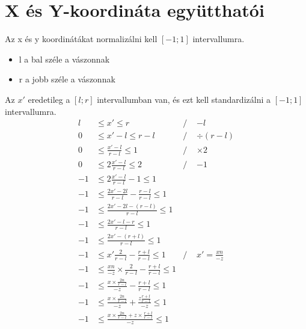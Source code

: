 \documentclass[12pt]{report}
\begin{document}
\section{X és Y-koordináta együtthatói}
Az x és y koordinátákat normalizálni kell $[-1;1]$ intervallumra.
\begin{itemize}
    \item l \text{-} a bal széle a vászonnak
    \item r \text{-} a jobb széle a vászonnak
\end{itemize}
Az $x'$ eredetileg a $[l;r]$ intervallumban van, és ezt kell standardizálni a $[-1;1]$ intervallumra.
\begin{align*}
    l  & \leq x' \leq r                                                           & \text{/ } & -l               \\
    0  & \leq x'-l \leq r-l                                                       & \text{/ } & \div (r-l)       \\
    0  & \leq \frac{x'-l}{r-l} \leq 1                                             & \text{/ } & \times 2         \\
    0  & \leq 2\frac{x'-l}{r-l} \leq 2                                            & \text{/ } & -1               \\
    -1 & \leq 2\frac{x'-l}{r-l}-1 \leq 1                                          &           &                  \\
    -1 & \leq \frac{2x'-2l}{r-l}-\frac{r-l}{r-l} \leq 1                           &           &                  \\
    -1 & \leq \frac{2x'-2l-(r-l)}{r-l} \leq 1                                     &           &                  \\
    -1 & \leq \frac{2x'-l-r}{r-l} \leq 1                                          &           &                  \\
    -1 & \leq \frac{2x'-(r+l)}{r-l} \leq 1                                        &           &                  \\
    -1 & \leq x'\frac{2}{r-l}-\frac{r+l}{r-l} \leq 1                              & \text{/ } & x'=\frac{xn}{-z} \\
    -1 & \leq \frac{xn}{-z}\times\frac{2}{r-l}-\frac{r+l}{r-l} \leq 1             &           &                  \\
    -1 & \leq \frac{x\times\frac{2n}{r-l}}{-z}-\frac{r+l}{r-l} \leq 1             &           &                  \\
    -1 & \leq \frac{x\times\frac{2n}{r-l}}{-z}+\frac{z\frac{r+l}{r-l}}{-z} \leq 1 &           &                  \\
    -1 & \leq \frac{x\times\frac{2n}{r-l}+z\times\frac{r+l}{r-l}}{-z} \leq 1      &           &                  \\
\end{align*}
\end{document}
